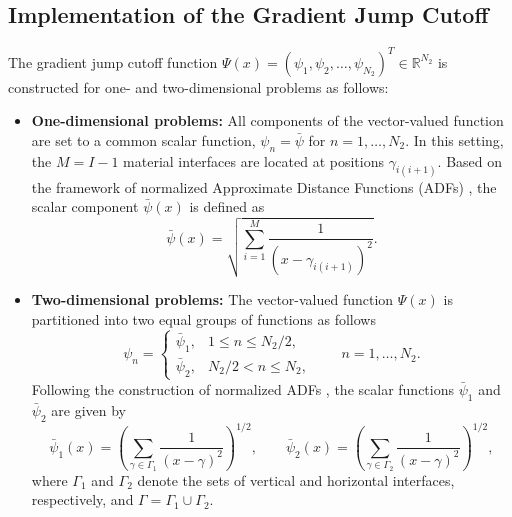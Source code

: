 \documentclass[oneside]{article}
\begin{document}
\subsection{Implementation of the Gradient Jump Cutoff}\label{Gradient jump cutoff}
The gradient jump cutoff function $\Psi(x) = (\psi_1, \psi_2, \ldots, \psi_{N_2})^T \in \mathbb{R}^{N_2}$ is constructed for one- and two-dimensional problems as follows:
\begin{itemize}
    \item \textbf{One-dimensional problems:} All components of the vector-valued function are set to a common scalar function, $\psi_n = \bar{\psi}$ for $n = 1, \dots, N_2$. In this setting, the $M = I-1$ material interfaces are located at positions $\gamma_{i(i+1)}$. Based on the framework of normalized Approximate Distance Functions (ADFs) \cite{berrone2023enforcing}, the scalar component $\bar{\psi}(x)$ is defined as
    \begin{equation}
    \bar{\psi}(x) = \sqrt{\sum_{i = 1}^M \frac{1}{(x - \gamma_{i(i + 1)})^2}}.
    \end{equation}

    \item \textbf{Two-dimensional problems:} The vector-valued function $\Psi(x)$ is partitioned into two equal groups of functions as follows
    \begin{equation}\label{eq2_Psi_2D}
    \psi_n =
    \begin{cases}
    \bar{\psi}_1, & 1 \le n \le N_2/2, \\[2pt]
    \bar{\psi}_2, & N_2/2 < n \le N_2,
    \end{cases}
    \qquad n = 1,\dots,N_2.
    \end{equation}
    Following the construction of normalized ADFs \cite{berrone2023enforcing}, the scalar functions $\bar{\psi}_1$ and $\bar{\psi}_2$ are given by
    \begin{equation}\label{eq2_psi}
    \bar{\psi}_1(x)
    =
    \left(\sum_{\gamma \in \Gamma_1}\frac{1}{(x-\gamma)^2}\right)^{1/2},
    \qquad
    \bar{\psi}_2(x)
    =
    \left(\sum_{\gamma \in \Gamma_2}\frac{1}{(x-\gamma)^2}\right)^{1/2},
    \end{equation}
    where $\Gamma_1$ and $\Gamma_2$ denote the sets of vertical and horizontal interfaces, respectively,
    and $\Gamma = \Gamma_1 \cup \Gamma_2$.
\end{itemize}
\end{document}
